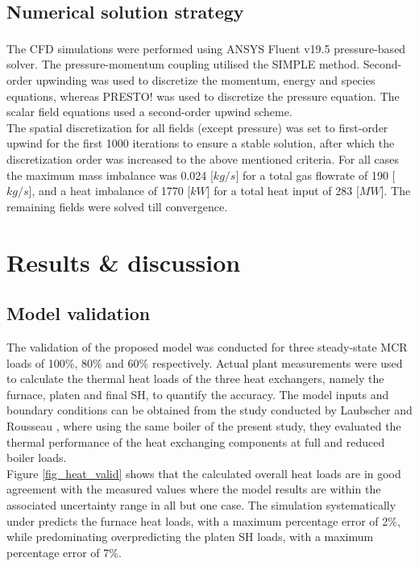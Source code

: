 \documentclass[twocolumn,10pt]{asme2ej}
\begin{document}
\subsection{Numerical solution strategy} 
The CFD simulations were performed using ANSYS Fluent v19.5\textsuperscript{\textregistered} pressure-based solver. The pressure-momentum coupling utilised the SIMPLE method. Second-order upwinding was used to discretize the momentum, energy and species equations, whereas PRESTO! was used to discretize the pressure equation. The scalar field equations used a second-order upwind scheme.\\

The spatial discretization for all fields (except pressure) was set to first-order upwind for the first 1000 iterations to ensure a stable solution, after which the discretization order was increased to the above mentioned criteria. For all cases the maximum mass imbalance was 0.024 [$kg/s$] for a total gas flowrate of 190 [$kg/s$], and a heat imbalance of 1770 [$kW$] for a total heat input of 283 [$MW$]. The remaining fields were solved till convergence.

\section{Results \& discussion}
\subsection{Model validation}\label{sec_model_valid}
The validation of the proposed model was conducted for three steady-state MCR loads of 100\%, 80\% and 60\% respectively. Actual plant measurements were used to calculate the thermal heat loads of the three heat exchangers, namely the furnace, platen and final SH, to quantify the accuracy. The model inputs and boundary conditions can be obtained from the study conducted by Laubscher and Rousseau \cite{Laubscher2019b}, where using the same boiler of the present study, they evaluated the thermal performance of the heat exchanging components at full and reduced boiler loads.\\

Figure \ref{fig_heat_valid} shows that the calculated overall heat loads are in good agreement with the measured values where the model results are within the associated uncertainty range in all but one case. The simulation systematically under predicts the furnace heat loads, with a maximum percentage error of 2\%, while predominating overpredicting the platen SH loads, with a maximum percentage error of 7\%.\\
\end{document}
